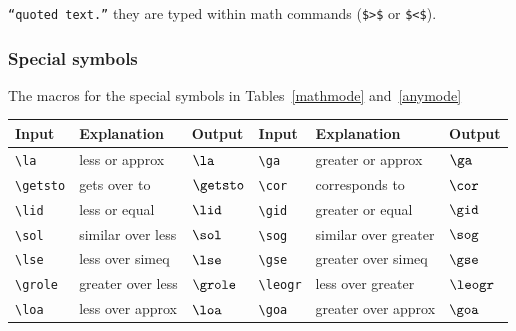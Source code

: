 \texttt{``quoted text.''} they are typed within math commands (\verb"$>$" or \verb"$<$").

\subsubsection{Special symbols}

The macros for the special symbols in Tables~\ref{mathmode} and~\ref{anymode}
%
\begin{table*}
\begin{minipage}{106mm}
\caption{Special symbols which can only be used in math mode.}\label{mathmode}
\begin{tabular}{@{}llllll}
Input & Explanation & Output & Input & Explanation & Output\\
\toprule
\verb"\la"     & less or approx       & $\la$     &
\verb"\ga"     & greater or approx    & $\ga$\\[2pt]
\verb"\getsto" & gets over to         & $\getsto$ &
\verb"\cor"    & corresponds to       & $\cor$\\[2pt]
\verb"\lid"    & less or equal        & $\lid$    &
\verb"\gid"    & greater or equal     & $\gid$\\[2pt]
\verb"\sol"    & similar over less    & $\sol$    &
\verb"\sog"    & similar over greater & $\sog$\\[2pt]
\verb"\lse"    & less over simeq      & $\lse$    &
\verb"\gse"    & greater over simeq   & $\gse$\\[2pt]
\verb"\grole"  & greater over less    & $\grole$  &
\verb"\leogr"  & less over greater    & $\leogr$\\[2pt]
\verb"\loa"    & less over approx     & $\loa$    &
\verb"\goa"    & greater over approx  & $\goa$\\
\bottomrule
\end{tabular}
\end{minipage}
\end{table*}
%
